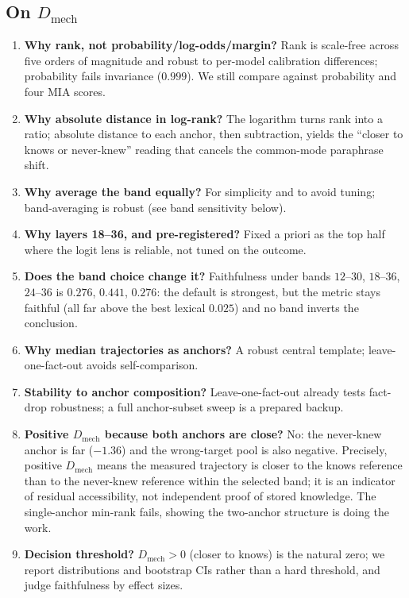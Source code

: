 \documentclass[11pt,a4paper]{article}
\newcommand{\dmech}{\ensuremath{D_{\text{mech}}}}
\begin{document}
\subsection*{On \dmech{}}
\begin{enumerate}[label=\arabic*.,start=6]
\item \textbf{Why rank, not probability/log-odds/margin?} Rank is scale-free across five orders of
magnitude and robust to per-model calibration differences; probability fails invariance ($0.999$). We
still compare against probability and four MIA scores.
\item \textbf{Why absolute distance in log-rank?} The logarithm turns rank into a ratio; absolute distance
to each anchor, then subtraction, yields the ``closer to knows or never-knew'' reading that cancels the
common-mode paraphrase shift.
\item \textbf{Why average the band equally?} For simplicity and to avoid tuning; band-averaging is robust
(see band sensitivity below).
\item \textbf{Why layers 18--36, and pre-registered?} Fixed a priori as the top half where the logit lens
is reliable, not tuned on the outcome.
\item \textbf{Does the band choice change it?} Faithfulness under bands $12$--$30$, $18$--$36$, $24$--$36$
is $0.276$, $0.441$, $0.276$: the default is strongest, but the metric stays faithful (all far above the
best lexical $0.025$) and no band inverts the conclusion.
\item \textbf{Why median trajectories as anchors?} A robust central template; leave-one-fact-out avoids
self-comparison.
\item \textbf{Stability to anchor composition?} Leave-one-fact-out already tests fact-drop robustness; a
full anchor-subset sweep is a prepared backup.
\item \textbf{Positive \dmech{} because both anchors are close?} No: the never-knew anchor is far
($-1.36$) and the wrong-target pool is also negative. Precisely, positive \dmech{} means the measured
trajectory is closer to the knows reference than to the never-knew reference within the selected band; it is
an indicator of residual accessibility, not independent proof of stored knowledge. The single-anchor
min-rank fails, showing the two-anchor structure is doing the work.
\item \textbf{Decision threshold?} $\dmech>0$ (closer to knows) is the natural zero; we report
distributions and bootstrap CIs rather than a hard threshold, and judge faithfulness by effect sizes.
\end{enumerate}
\end{document}

